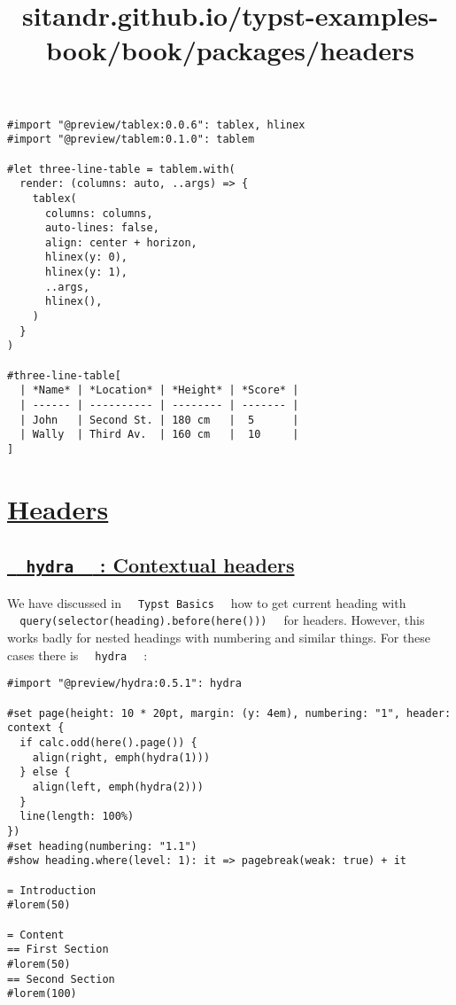 \begin{verbatim}
#import "@preview/tablex:0.0.6": tablex, hlinex
#import "@preview/tablem:0.1.0": tablem

#let three-line-table = tablem.with(
  render: (columns: auto, ..args) => {
    tablex(
      columns: columns,
      auto-lines: false,
      align: center + horizon,
      hlinex(y: 0),
      hlinex(y: 1),
      ..args,
      hlinex(),
    )
  }
)

#three-line-table[
  | *Name* | *Location* | *Height* | *Score* |
  | ------ | ---------- | -------- | ------- |
  | John   | Second St. | 180 cm   |  5      |
  | Wally  | Third Av.  | 160 cm   |  10     |
]
\end{verbatim}

\pandocbounded{}


\title{sitandr.github.io/typst-examples-book/book/packages/headers}

\section{\texorpdfstring{\hyperref[headers]{Headers}}{Headers}}\label{headers}

\subsection{\texorpdfstring{\hyperref[hydra-contextual-headers]{\texttt{\ }{\texttt{\ hydra\ }}\texttt{\ }
: Contextual
headers}}{  hydra   : Contextual headers}}\label{hydra-contextual-headers}

We have discussed in \texttt{\ }{\texttt{\ Typst\ Basics\ }}\texttt{\ }
how to get current heading with
\texttt{\ }{\texttt{\ query(selector(heading).before(here()))\ }}\texttt{\ }
for headers. However, this works badly for nested headings with
numbering and similar things. For these cases there is
\texttt{\ }{\texttt{\ hydra\ }}\texttt{\ } :

\begin{verbatim}
#import "@preview/hydra:0.5.1": hydra

#set page(height: 10 * 20pt, margin: (y: 4em), numbering: "1", header: context {
  if calc.odd(here().page()) {
    align(right, emph(hydra(1)))
  } else {
    align(left, emph(hydra(2)))
  }
  line(length: 100%)
})
#set heading(numbering: "1.1")
#show heading.where(level: 1): it => pagebreak(weak: true) + it

= Introduction
#lorem(50)

= Content
== First Section
#lorem(50)
== Second Section
#lorem(100)
\end{verbatim}

